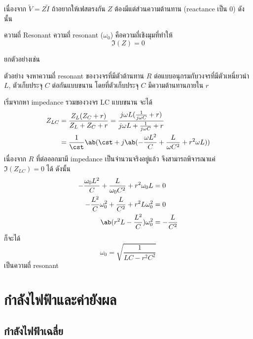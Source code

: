 เนื่องจาก $\tilde{V} = Z\tilde{I}$ ถ้าอยากให้เฟสตรงกัน $Z$ ต้องมีแต่ส่วนความต้านทาน (reactance เป็น 0) ดังนั้น
\begin{lawbox}{ความถี่ Resonant}
    ความถี่ resonant ($\omega_0$) คือความถี่เชิงมุมที่ทำให้
    \begin{equation}
        \Im(Z) = 0
    \end{equation}
\end{lawbox}
ยกตัวอย่างเช่น
\begin{corbox}{ตัวอย่าง}
    จงหาความถี่ resonant ของวงจรที่มีตัวต้านทาน $R$ ต่อแบบอนุกรมกับวงจรที่มีตัวเหนี่ยวนำ $L$, ตัวเก็บประจุ $C$ ต่อกันแบบขนาน โดยที่ตัวเก็บประจุ $C$ มีความต้านทานภายใน $r$
\end{corbox}
\begin{soln}
    เริ่มจากหา impedance รวมของวงจร LC แบบขนาน จะได้
    \begin{align*}
        Z_{LC} &= \frac{Z_L(Z_C + r)}{Z_L + Z_C + r} = \frac{j\omega L (\frac{1}{j\omega C} + r)}{j\omega L + \frac{1}{j\omega C} + r} \\
        &= \frac{1}{\cst}\ab(\cst + j\ab(-\frac{\omega L^2}{C} + \frac{L}{\omega C^2} + r^2\omega L)) 
    \end{align*}
    เนื่องจาก $R$ ที่ต่อออกมามี impedance เป็นจำนวนจริงอยู่แล้ว จึงสามารถพิจารณาแค่ $\Im(Z_{LC}) = 0$ ได้ ดังนั้น
    \begin{align*}
        -\frac{\omega_0 L^2}{C} + \frac{L}{\omega_0 C^2} + r^2\omega_0 L &= 0\\
        -\frac{L^2}{C}\omega_0^2 + \frac{L}{C^2} + r^2L\omega_0^2 &= 0\\
        \ab(r^2L - \frac{L^2}{C})\omega_0^2 &= -\frac{L}{C^2}
    \end{align*}
    ก็จะได้
    \[
    \omega_0 = \sqrt{\frac{1}{LC - r^2C^2}}
    \]
    เป็นความถี่ resonant
\end{soln}

\section{กำลังไฟฟ้าและค่ายังผล}

\subsection{กำลังไฟฟ้าเฉลี่ย}

